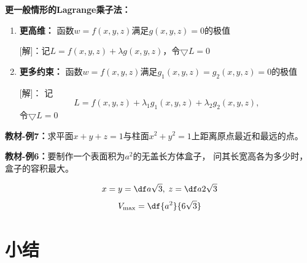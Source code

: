 {\bf 更一般情形的Lagrange乘子法：}

\begin{enumerate}[(1)]
  \setlength{\itemindent}{1cm}
  \item {\bf 更高维：} 函数$w=f(x,y,z)$满足$g(x,y,z)=0$的极值 
  
  [解]：记$L=f(x,y,z)+\lambda g(x,y,z)$，令$\bigtriangledown L=0$ 
  \item {\bf 更多约束：} 函数$w=f(x,y,z)$满足$g_1(x,y,z)=g_2(x,y,z)=0$的极值 
  
  [解]： 记
  $$L=f(x,y,z)+\lambda_1 g_1(x,y,z)+\lambda_2 g_2(x,y,z),$$
  令$\bigtriangledown L=0$
\end{enumerate}

{\bf 教材-例7：}求平面$x+y+z=1$与柱面$x^2+y^2=1$上距离原点最近和最远的点。

\begin{center}
\end{center}

{\bf 教材-例6：}要制作一个表面积为$a^2$的无盖长方体盒子，
问其长宽高各为多少时，盒子的容积最大。

$$x=y=\df a{\sqrt 3},\;z=\df a{2\sqrt3}$$
$$V_{\max}=\df{a^2}{6\sqrt 3}$$

\section{小结}

